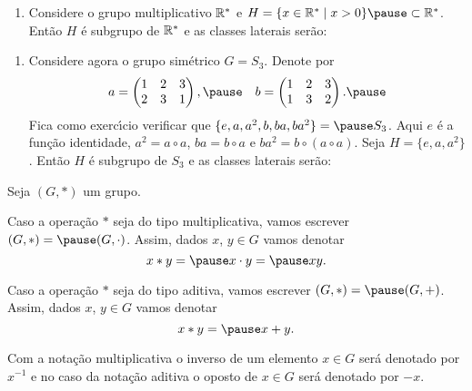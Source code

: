 \documentclass{beamer}
\begin{document}
    \begin{frame}
        \begin{exemplos}
            \begin{enumerate}[label={\roman*})]
                \conti
                \item Considere o grupo multiplicativo $\mathbb{R}^*$ \pause e $H = \{ x \in \real^* \mid x > 0\} \pause \subset \real^*$. \pause Então $H$ é subgrupo de $\mathbb{R}^*$ \pause e as classes laterais serão:
                \seti
            \end{enumerate}
        \end{exemplos}
    \end{frame}

    \begin{frame}
        \begin{exemplos}
            \begin{enumerate}[label={\roman*})]
                \conti
                \item Considere agora o grupo simétrico $G = S_3$. \pause Denote por \pause
                \[
                    a = \begin{pmatrix}
                        1 & 2 & 3\\2 & 3 & 1
                    \end{pmatrix}, \pause \quad
                    b = \begin{pmatrix}
                        1 & 2 & 3\\1 & 3 & 2
                    \end{pmatrix}. \pause
                \]
                Fica como exerc{\'\i}cio verificar que $\{e, a, a^2 , b, ba, ba^2\} = \pause S_3$. \pause Aqui $e$ é a função identidade, \pause $a^2 = a \circ a$, \pause $ba = b \circ a$ e \pause $ba^2 = b\circ(a\circ a)$. \pause Seja $H = \{e, a , a^2\}$. \pause Então $H$ é subgrupo de $S_3$ \pause e as classes laterais serão:
            \end{enumerate}
        \end{exemplos}
    \end{frame}

    \begin{frame}
        Seja $(G, *)$ um grupo. \pause

        Caso a operação $*$ seja do tipo multiplicativa, vamos escrever $(G, *) = \pause (G, \cdot)$. \pause Assim, dados $x$, $y \in G$ vamos denotar\pause
        \[
            x * y = \pause x \cdot y = \pause xy.
        \]

        Caso a operação $*$ seja do tipo aditiva, vamos escrever $(G, *) = \pause (G, +)$. \pause Assim, dados $x$, $y \in G$ vamos denotar\pause
        \[
            x * y = \pause x + y.
        \]

        Com a notação multiplicativa \pause o inverso de um elemento $x \in G$ \pause será denotado por $x^{-1}$ \pause e no caso da notação aditiva \pause o oposto de $x \in G$ \pause será denotado por $-x$.
    \end{frame}
\end{document}
